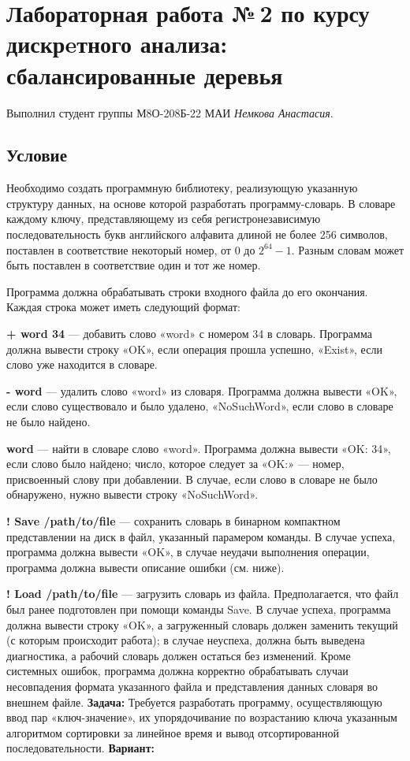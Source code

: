 \documentclass[12pt]{article}
\begin{document}
\section*{Лабораторная работа №\,2 по курсу дискрeтного анализа: сбалансированные деревья}

Выполнил студент группы М8О-208Б-22 МАИ \textit{Немкова Анастасия}.

\subsection*{Условие}
Необходимо создать программную библиотеку, реализующую указанную структуру данных, на основе которой разработать программу-словарь. В словаре каждому ключу, представляющему из себя регистронезависимую последовательность букв английского алфавита длиной не более 256 символов, поставлен в соответствие некоторый номер, от 0 до  $2^{64} - 1$. Разным словам может быть поставлен в соответствие один и тот же номер.

Программа должна обрабатывать строки входного файла до его окончания. Каждая строка может иметь следующий формат:

\textbf{+ word 34} — добавить слово «word» с номером 34 в словарь. Программа должна вывести строку «OK», если операция прошла успешно, «Exist», если слово уже находится в словаре.

\textbf{- word} — удалить слово «word» из словаря. Программа должна вывести «OK», если слово существовало и было удалено, «NoSuchWord», если слово в словаре не было найдено.

\textbf{word} — найти в словаре слово «word». Программа должна вывести «OK: 34», если слово было найдено; число, которое следует за «OK:» — номер, присвоенный слову при добавлении. В случае, если слово в словаре не было обнаружено, нужно вывести строку «NoSuchWord».

\textbf{! Save /path/to/file} — сохранить словарь в бинарном компактном представлении на диск в файл, указанный парамером команды. В случае успеха, программа должна вывести «OK», в случае неудачи выполнения операции, программа должна вывести описание ошибки (см. ниже).

\textbf{! Load /path/to/file} — загрузить словарь из файла. Предполагается, что файл был ранее подготовлен при помощи команды Save. В случае успеха, программа должна вывести строку «OK», а загруженный словарь должен заменить текущий (с которым происходит работа); в случае неуспеха, должна быть выведена диагностика, а рабочий словарь должен остаться без изменений. Кроме системных ошибок, программа должна корректно обрабатывать случаи несовпадения формата указанного файла и представления данных словаря во внешнем файле.
\textbf{Задача:}
Требуется разработать программу, осуществляющую ввод пар «ключ-значение», их упорядочивание по возрастанию ключа указанным алгоритмом сортировки за линейное время и вывод отсортированной последовательности.\newline
\newline
\textbf{Вариант:}
\end{document}
